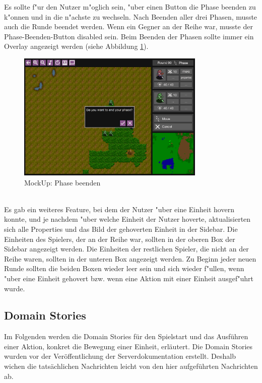 \documentclass[12pt, titlepage]{scrartcl}
\newcounter{subsubsubsection}[subsubsection]
\begin{document}
			        Es sollte f"ur den Nutzer m"oglich sein, "uber einen Button die Phase beenden zu k"onnen und in die n"achste zu wechseln. Nach Beenden aller drei Phasen, musste auch die Runde beendet werden. Wenn ein Gegner an der Reihe war, musste der Phase-Beenden-Button disabled sein. Beim Beenden der Phasen sollte immer ein Overlay angezeigt werden (siehe Abbildung \ref{Phase_End}). \\
			        \begin{figure}[H] 
    				    \centering
    				    \includegraphics[width=0.8\textwidth]{images/mockUps/EndPhase.png}
    				    \caption{MockUp: Phase beenden}
    				    \label{Phase_End}
			        \end{figure}
			        \ \\ Es gab ein weiteres Feature, bei dem der Nutzer "uber eine Einheit hovern konnte, und je nachdem "uber welche Einheit der Nutzer hoverte, aktualisierten sich alle Properties und das Bild der gehoverten Einheit in der Sidebar. Die Einheiten des Spielers, der an der Reihe war, sollten in der oberen Box der Sidebar angezeigt werden. Die Einheiten der restlichen Spieler, die nicht an der Reihe waren, sollten in der unteren Box angezeigt werden. Zu Beginn jeder neuen Runde sollten die beiden Boxen wieder leer sein und sich wieder f"ullen, wenn "uber eine Einheit gehovert bzw. wenn eine Aktion mit einer Einheit ausgef"uhrt wurde.
		\subsection{Domain Stories}
		    Im Folgenden werden die Domain Stories f\"ur den Spielstart und das Ausf\"uhren einer Aktion, konkret die Bewegung einer Einheit, erl\"autert. Die Domain Stories wurden vor der Ver\"offentlichung der Serverdokumentation erstellt. Deshalb wichen die tats\"achlichen Nachrichten leicht von den hier aufgef\"uhrten Nachrichten ab. \\
\end{document}
